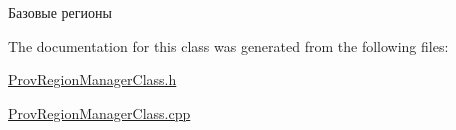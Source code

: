 Базовые регионы 



The documentation for this class was generated from the following files\+:\begin{DoxyCompactItemize}
\item 
\hyperlink{_prov_region_manager_class_8h}{Prov\+Region\+Manager\+Class.\+h}\item 
\hyperlink{_prov_region_manager_class_8cpp}{Prov\+Region\+Manager\+Class.\+cpp}\end{DoxyCompactItemize}
